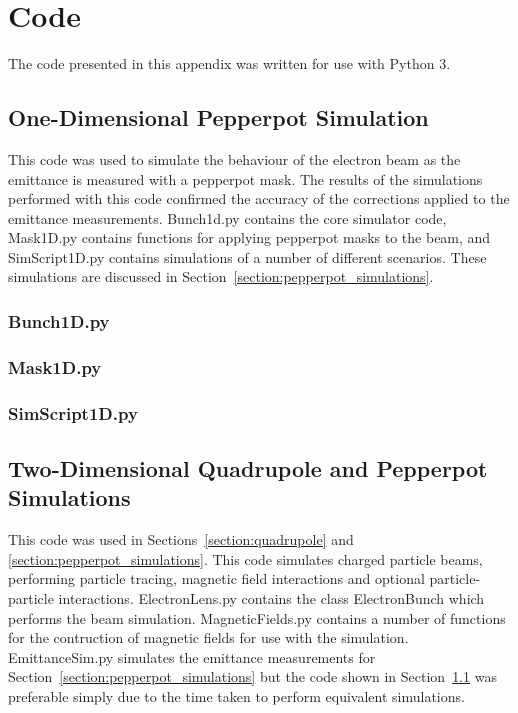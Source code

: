 \chapter{Code}\label{appendix:code}

The code presented in this appendix was written for use with Python 3.

\section{One-Dimensional Pepperpot Simulation}\label{section:1d_code}

This code was used to simulate the behaviour of the electron beam as the emittance is measured with a pepperpot mask.
The results of the simulations performed with this code confirmed the accuracy of the corrections applied to the emittance measurements.
Bunch1d.py contains the core simulator code, Mask1D.py contains functions for applying pepperpot masks to the beam, and SimScript1D.py contains simulations of a number of different scenarios.
These simulations are discussed in Section~\ref{section:pepperpot_simulations}.

\subsection{Bunch1D.py}


\subsection{Mask1D.py}


\subsection{SimScript1D.py}


\newpage
\section{Two-Dimensional Quadrupole and Pepperpot Simulations}

This code was used in Sections~\ref{section:quadrupole} and \ref{section:pepperpot_simulations}.
This code simulates charged particle beams, performing particle tracing, magnetic field interactions and optional particle-particle interactions.
ElectronLens.py contains the class ElectronBunch which performs the beam simulation.
MagneticFields.py contains a number of functions for the contruction of magnetic fields for use with the simulation.
EmittanceSim.py simulates the emittance measurements for Section~\ref{section:pepperpot_simulations} but the code shown in Section~\ref{section:1d_code} was preferable simply due to the time taken to perform equivalent simulations.

